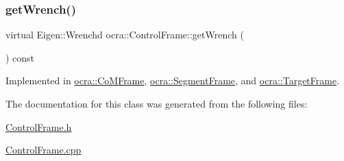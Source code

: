 \subsubsection{\texorpdfstring{get\+Wrench()}{getWrench()}}
{\footnotesize\ttfamily virtual Eigen\+::\+Wrenchd ocra\+::\+Control\+Frame\+::get\+Wrench (\begin{DoxyParamCaption}{ }\end{DoxyParamCaption}) const\hspace{0.3cm}{\ttfamily [pure virtual]}}



Implemented in \hyperlink{classocra_1_1CoMFrame_a8e00462bbe13df6f595b7000d44240c6}{ocra\+::\+Co\+M\+Frame}, \hyperlink{classocra_1_1SegmentFrame_a47bebcb9817083395ab034fe8fb72a19}{ocra\+::\+Segment\+Frame}, and \hyperlink{classocra_1_1TargetFrame_a5e9ccc5e2e5ae8e52a37b5810a76115d}{ocra\+::\+Target\+Frame}.



The documentation for this class was generated from the following files\+:\begin{DoxyCompactItemize}
\item 
\hyperlink{ControlFrame_8h}{Control\+Frame.\+h}\item 
\hyperlink{ControlFrame_8cpp}{Control\+Frame.\+cpp}\end{DoxyCompactItemize}
